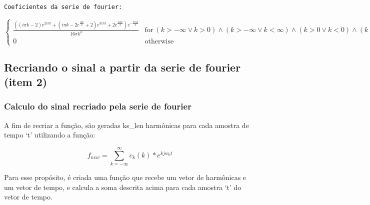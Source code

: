 \documentclass{article}
\begin{document}
    \begin{Verbatim}[commandchars=\\\{\}]
Coeficientes da serie de fourier:
    \end{Verbatim}

    $\displaystyle \begin{cases} \frac{\left(\left(i \pi k - 2\right) e^{2 i \pi k} + \left(i \pi k - 2 e^{\frac{i \pi k}{2}} + 2\right) e^{3 i \pi k} + 2 e^{\frac{3 i \pi k}{2}}\right) e^{- \frac{7 i \pi k}{2}}}{16 \pi k^{2}} & \text{for}\: \left(k > -\infty \vee k > 0\right) \wedge \left(k > -\infty \vee k < \infty\right) \wedge \left(k > 0 \vee k < 0\right) \wedge \left(k < 0 \vee k < \infty\right) \\0 & \text{otherwise} \end{cases}$

    
    \hypertarget{recriando-o-sinal-a-partir-da-serie-de-fourier-item-2}{%
\subsection{Recriando o sinal a partir da serie de fourier (item
2)}\label{recriando-o-sinal-a-partir-da-serie-de-fourier-item-2}}

    \hypertarget{calculo-do-sinal-recriado-pela-serie-de-fourier}{%
\subsubsection{Calculo do sinal recriado pela serie de
fourier}\label{calculo-do-sinal-recriado-pela-serie-de-fourier}}

A fim de recriar a função, são geradas ks\_len harmônicas para cada
amostra de tempo `t' utilizando a função:

\[ 
f_{new} =
\sum_{k = -\infty}^{\infty}
c_k(k) * e^{k j w_0 t}
\]

Para esse propósito, é criada uma função que recebe um vetor de
harmônicas e um vetor de tempo, e calcula a soma descrita acima para
cada amostra `t' do vetor de tempo.
\end{document}
